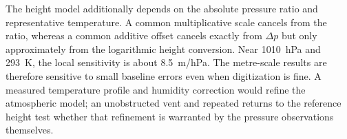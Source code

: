 The height model additionally depends on the absolute pressure ratio and representative temperature. A common multiplicative scale cancels from the ratio, whereas a common additive offset cancels exactly from $\Delta p$ but only approximately from the logarithmic height conversion. Near 1010~hPa and 293~K, the local sensitivity is about 8.5~m/hPa. The metre-scale results are therefore sensitive to small baseline errors even when digitization is fine. A measured temperature profile and humidity correction would refine the atmospheric model; an unobstructed vent and repeated returns to the reference height test whether that refinement is warranted by the pressure observations themselves.
